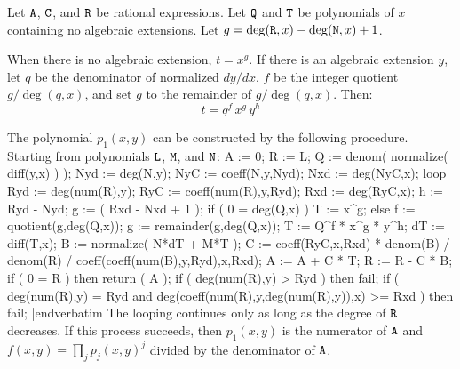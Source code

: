Let ${\tt{A}}$, ${\tt{C}}$, and ${\tt{R}}$ be rational expressions.
Let ${\tt{Q}}$ and ${\tt{T}}$ be polynomials of $x$ containing no
algebraic extensions.  Let $g=\deg({\tt{R}},x)-\deg({\tt{N}},x)+1$.

When there is no algebraic extension, $t=x^g$.  If there is an
algebraic extension $y$, let $q$ be the denominator of normalized
${d{y}/d{x}}$, $f$ be the integer quotient ${g/\deg(q,x)}$, and set
$g$ to the remainder of ${g/\deg(q,x)}$.  Then:
$$t=q^f\,x^g\,y^h$$


The polynomial $p_1(x,y)$ can be constructed by the following
procedure.  Starting from polynomials ${\tt{L}}$, ${\tt{M}}$, and
${\tt{N}}$:
\medskip
\verbatim
  A := 0;
  R := L;
  Q := denom( normalize( diff(y,x) ) );
  Nyd := deg(N,y);
  NyC := coeff(N,y,Nyd);
  Nxd := deg(NyC,x);
  loop
    Ryd := deg(num(R),y);
    RyC := coeff(num(R),y,Ryd);
    Rxd := deg(RyC,x);
    h := Ryd - Nyd;
    g := ( Rxd - Nxd + 1 );
    if ( 0 = deg(Q,x) )
      T := x^g;
    else
      f := quotient(g,deg(Q,x));
      g := remainder(g,deg(Q,x));
      T := Q^f * x^g * y^h;
    dT := diff(T,x);
    B := normalize( N*dT + M*T );
    C := coeff(RyC,x,Rxd) * denom(B) / denom(R)
         / coeff(coeff(num(B),y,Ryd),x,Rxd);
    A := A + C * T;
    R := R - C * B;
    if ( 0 = R ) then return ( A );
    if ( deg(num(R),y) > Ryd ) then fail;
    if ( deg(num(R),y) = Ryd and
         deg(coeff(num(R),y,deg(num(R),y)),x) >= Rxd ) then fail;
|endverbatim
\medskip
The looping continues only as long as the degree of ${\tt{R}}$
decreases.  If this process succeeds, then $p_1(x,y)$ is the numerator
of ${\tt{A}}$ and $f(x,y)=\prod_jp_j(x,y)^j$ divided by the
denominator of ${\tt{A}}$.





\vfill\eject
\bye
